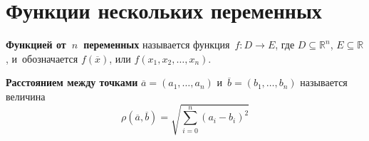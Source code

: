 \section{Функции нескольких переменных}
\textbf{Функцией от~$n$~переменных} называется функция~$f \colon D \to E$, где $D \subseteq \mathbb R^n$, $E \subseteq \mathbb R$, и~обозначается $f(\overline x)$, или $f(x_1, x_2, \ldots, x_n)$.

 \textbf{Расстоянием между точками} $\overline a = (a_1, \ldots, a_n)$ и~$\overline b = (b_1, \ldots, b_n)$ называется величина
\begin{equation*}
\rho(\overline a, \overline b) = \sqrt{\sum_{i=0}^n (a_i - b_i)^2}
\end{equation*}